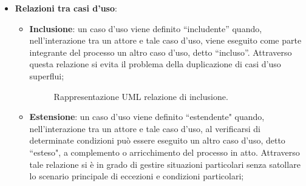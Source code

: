 \begin{itemize}
\begin{figure}[H]
        \end{figure}
    \item \textbf{Relazioni tra casi d'uso}: 
        \begin{itemize}
        \item \textbf{Inclusione}: un caso d'uso viene definito ``includente'' quando, nell'interazione tra un attore e tale caso d'uso, viene eseguito come parte integrante del processo un altro caso d'uso, detto ``incluso''. Attraverso questa relazione si evita il problema della duplicazione di casi d'uso superflui; 
            \begin{figure}[H]
                \centering
                \caption{Rappresentazione UML relazione di inclusione.}
                \label{fig:Rappresentazione UML relazione di inclusione}
            \end{figure}
        \item \textbf{Estensione}: un caso d'uso viene definito ``estendente" quando,
            nell'interazione tra un attore e tale caso d'uso, al verificarsi di determinate
                condizioni può essere eseguito un altro caso d'uso, detto ``esteso", a complemento o arricchimento del processo in atto. Attraverso tale relazione si è in grado di gestire situazioni particolari senza satollare lo scenario principale di eccezioni e condizioni particolari;
            \begin{figure}[H]
                \centering
\end{figure}
\end{itemize}
\end{itemize}
